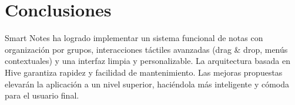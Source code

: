 \documentclass[12pt,a4paper]{article}
\begin{document}
\section{Conclusiones}
Smart Notes ha logrado implementar un sistema funcional de notas con organización por grupos, interacciones táctiles avanzadas (drag \& drop, menús contextuales) y una interfaz limpia y personalizable. La arquitectura basada en Hive garantiza rapidez y facilidad de mantenimiento. Las mejoras propuestas elevarán la aplicación a un nivel superior, haciéndola más inteligente y cómoda para el usuario final.
\end{document}
